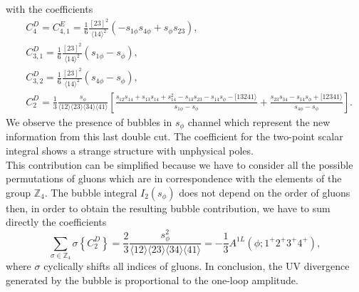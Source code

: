 with the coefficients
\begin{align*}
	&C_{4}^D=C_{4,1}^E=\frac{1}{6}\frac{[23]^2}{\langle 14 \rangle^2}(-s_{1\phi}s_{4\phi}+s_\phi s_{23}),\\
	&C_{3,1}^D=\frac{1}{6}\frac{[23]^2}{\langle 14 \rangle^2}(s_{1\phi}-s_\phi),\\
	&C_{3,2}^D=\frac{1}{6}\frac{[23]^2}{\langle 14 \rangle^2}(s_{4\phi}-s_\phi),\\
	&C_2^D=\frac{1}{3}\frac{s_\phi}{\langle 12 \rangle \langle 23 \rangle\langle 34 \rangle \langle 41 \rangle}\left[\frac{s_{12}s_{14}+s_{13}s_{14}+s_{14}^2-s_{13}s_{23}-s_{14}s_\phi-[13241\rangle}{s_{1\phi}-s_\phi}+\frac{s_{23}s_{34}-s_{14}s_\phi+[12341\rangle}{s_{4\phi}-s_\phi}\right].
\end{align*}
We observe the presence of bubbles in $s_\phi$ channel which represent the new information from this last double cut. The coefficient for the two-point scalar integral shows a strange structure with unphysical poles.\\This contribution can be simplified because we have to consider all the possible permutations of gluons which are in correspondence with the elements of the group $\mathbb{Z}_4$. The bubble integral $I_2(s_\phi)$ does not depend on the order of gluons then, in order to obtain the resulting bubble contribution, we have to sum directly the coefficients 
$$
	\sum_{\sigma\in\mathbb{Z}_4} \sigma\left\{C_2^D\right\}=\frac{2}{3}\frac{s_\phi^2}{\langle 12 \rangle \langle 23 \rangle\langle 34 \rangle \langle 41 \rangle}=-\frac{1}{3}A^{1L}(\phi;1^+2^+3^+4^+),
$$
where $\sigma$ cyclically shifts all indices of gluons. In conclusion, the UV divergence generated by the bubble is proportional to the one-loop amplitude.

